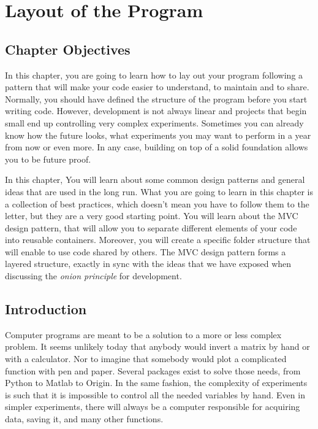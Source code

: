 \chapter{Layout of the Program}\label{layout-of-theprogram}

\section{Chapter Objectives}\label{chapterobjectives}
In this chapter, you are going to learn how to lay out your program
following a pattern that will make your code easier to understand, to
maintain and to share. Normally, you should have defined the structure
of the program before you start writing code. However, development is
not always linear and projects that begin small end up controlling very
complex experiments. Sometimes you can already know how the future
looks, what experiments you may want to perform in a year from now or
even more. In any case, building on top of a solid foundation allows you
to be future proof.

In this chapter, You will learn about some common design patterns and
general ideas that are used in the long run. What you are going to learn
in this chapter is a collection of best practices, which doesn't mean
you have to follow them to the letter, but they are a very good starting
point. You will learn about the {MVC} design pattern, that will allow
you to separate different elements of your code into reusable
containers. Moreover, you will create a specific folder structure that
will enable to use code shared by others. The {MVC} design pattern forms
a layered structure, exactly in sync with the ideas that we have exposed
when discussing the \emph{onion principle} for development.

\section{Introduction}\label{introduction}

Computer programs are meant to be a solution to a more or less complex
problem. It seems unlikely today that anybody would invert a matrix by
hand or with a calculator. Nor to imagine that somebody would plot a
complicated function with pen and paper. Several packages exist to solve
those needs, from Python to Matlab to Origin. In the same fashion, the
complexity of experiments is such that it is impossible to control all
the needed variables by hand. Even in simpler experiments, there will
always be a computer responsible for acquiring data, saving it, and many
other functions.


